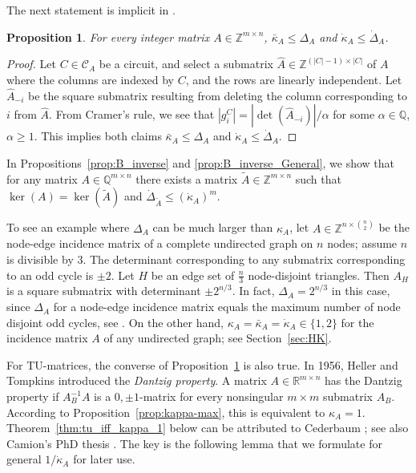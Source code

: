 \documentclass[11pt, a4paper]{article}
\newcommand{\Le}{\kappa}
\newcommand{\circuits}{\mathcal{C}}
\newcommand{\1}{\mathbbm{1}}
\newcommand{\kd}{{\dot{\kappa}}}
\newcommand{\Q}{\mathbb{Q}}
\newtheorem{prop}[theorem]{Proposition}
\theoremstyle{case}
\newcommand{\R}{\mathbb{R}}
\newcommand{\Z}{\mathbb{Z}}
\begin{document}
The next statement is implicit in \cite[Proposition 5.3]{Lee89}. 
\begin{prop}
  \label{prop:kappa-delta}
  For every integer matrix $A\in \Z^{m\times n}$, $\bar\Le_A\le \Delta_A$ and $\kd_A\le\dot\Delta_A$.
\end{prop}
\begin{proof}
Let  $C\in\circuits_A$ be a circuit, and select a submatrix $\hat A\in \Z^{(|C|-1)\times |C|}$ of $A$ where the columns are indexed by $C$, and the rows are linearly independent. 
Let $\hat A_{-i}$ be the square submatrix resulting from deleting the column corresponding to $i$ from $\hat A$.
From Cramer's rule, we see that $|g^C_i|=|\det(\hat A_{-i})|/\alpha$ for some $\alpha\in\Q$, $\alpha \ge 1$. This implies both claims $\bar\Le_A\le \Delta_A$ and $\kd_A\le\dot\Delta_A$.
\end{proof}

In Propositions~\ref{prop:B_inverse} and \ref{prop:B_inverse_General}, 
we show that for any matrix $A \in \Q^{m \times n}$ there exists a matrix $\tilde A \in \Z^{m \times n}$ such that $\ker(A) = \ker(\tilde A)$ and $\dot\Delta_{\tilde A} \le (\kd_A)^{m}$.

To see an example where $\Delta_A$ can be much larger than $\kappa_A$, let $A\in \Z^{n\times \binom{n}{2}}$ be the node-edge incidence matrix of a complete undirected graph on $n$ nodes; assume $n$ is divisible by $3$. The determinant corresponding to any submatrix corresponding to an odd cycle is $\pm 2$. Let $H$ be an edge set of $\frac{n}3$ node-disjoint triangles. Then $A_H$ is a square submatrix with determinant $\pm 2^{n/3}$. In fact, $\Delta_A=2^{n/3}$ in this case, since $\Delta_A$ for a node-edge incidence matrix equals the maximum number of node disjoint odd cycles, see  \cite{grossmanMinorsIncidenceMatrix1995}.
On the other hand, $\kappa_A=\bar\kappa_A=\kd_A\in \{1,2\}$ for the incidence matrix $A$ of any undirected graph; see Section~\ref{sec:HK}.

\medskip

For TU-matrices, the converse of Proposition~\ref{prop:kappa-delta}  is also true. In 1956, Heller and Tompkins \cite{heller1957,heller1956} introduced the \emph{Dantzig property}. A matrix $A\in\R^{m\times n}$ has the Dantzig property if $A^{-1}_B A$ is a $0,\pm 1$-matrix for every nonsingular $m\times m$ submatrix $A_B$. According to Proposition~\ref{prop:kappa-max}, this is equivalent to $\kappa_A=1$. Theorem~\ref{thm:tu_iff_kappa_1} below can be attributed to Cederbaum \cite[Proposition (v)]{Cederbaum57}; see also Camion's PhD thesis \cite[Theorem 2.4.5(f)]{camion1964}.
The key is the following lemma that we formulate for general $1/\kd_A$ for later use.
\end{document}
